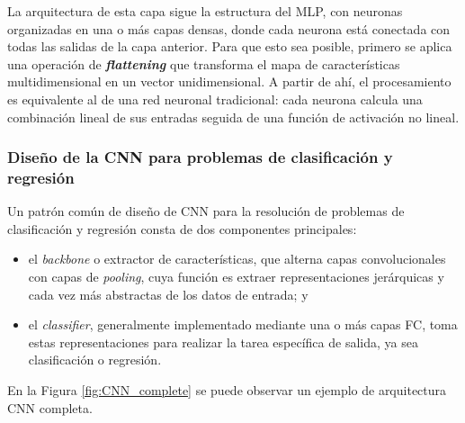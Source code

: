 La arquitectura de esta capa sigue la estructura del \acrshort{MLP}, con neuronas organizadas en una o más capas densas, donde cada neurona está conectada con todas las salidas de la capa anterior. Para que esto sea posible, primero se aplica una operación de \textbf{\textit{flattening}} que transforma el mapa de características multidimensional en un vector unidimensional. A partir de ahí, el procesamiento es equivalente al de una red neuronal tradicional: cada neurona calcula una combinación lineal de sus entradas seguida de una función de activación no lineal.


\subsubsection{Diseño de la CNN para problemas de clasificación y regresión}

Un patrón común de diseño de \acrshort{CNN} para la resolución de problemas de clasificación y regresión consta de dos
componentes principales:

\begin{itemize}

    \item el \textit{backbone} o extractor de características, que alterna capas convolucionales con capas de
    \textit{pooling}, cuya función es extraer representaciones jerárquicas y cada vez más abstractas de los 
    datos de entrada; y

    \item el \textit{classifier}, generalmente implementado mediante una o más capas \acrshort{FC}, 
    toma estas representaciones para realizar la tarea específica de salida, ya sea clasificación o regresión.

\end{itemize}

En la Figura \ref{fig:CNN_complete} se puede observar un ejemplo de arquitectura \acrshort{CNN} completa. 


